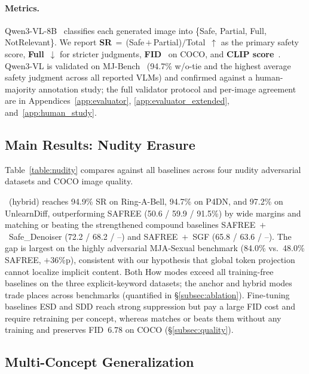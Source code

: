 \paragraph{Metrics.} Qwen3-VL-8B~\citep{bai2025qwen3} classifies each generated image into \{Safe, Partial, Full, NotRelevant\}. We report \textbf{SR}\,$=$\,(Safe\,$+$\,Partial)$/$Total~$\uparrow$ as the primary safety score, \textbf{Full}~$\downarrow$ for stricter judgments, \textbf{FID}~\citep{heusel2017gans} on COCO, and \textbf{CLIP score}~\citep{hessel2021clipscore}. Qwen3-VL is validated on MJ-Bench~\citep{chen2024mj} (94.7\% w/o-tie and the highest average safety judgment across all reported VLMs) and confirmed against a human-majority annotation study; the full validator protocol and per-image agreement are in Appendices~\ref{app:evaluator}, \ref{app:evaluator_extended}, and~\ref{app:human_study}.

\subsection{Main Results: Nudity Erasure}
\label{subsec:main_results}

Table~\ref{table:nudity} compares \ours{} against all baselines across four nudity adversarial datasets and COCO image quality.



\ours{}~(hybrid) reaches 94.9\% SR on Ring-A-Bell, 94.7\% on P4DN, and 97.2\% on UnlearnDiff, outperforming SAFREE (50.6 / 59.9 / 91.5\%) by wide margins and matching or beating the strengthened compound baselines SAFREE~$+$~Safe\_Denoiser (72.2 / 68.2 / --) and SAFREE~$+$~SGF (65.8 / 63.6 / --). The gap is largest on the highly adversarial MJA-Sexual benchmark (84.0\% vs.\ 48.0\% SAFREE, $+36$\%p), consistent with our hypothesis that global token projection cannot localize implicit content. Both How modes exceed all training-free baselines on the three explicit-keyword datasets; the anchor and hybrid modes trade places across benchmarks (quantified in \S\ref{subsec:ablation}). Fine-tuning baselines ESD and SDD reach strong suppression but pay a large FID cost and require retraining per concept, whereas \ours{} matches or beats them without any training and preserves FID~6.78 on COCO (\S\ref{subsec:quality}).

\subsection{Multi-Concept Generalization}
\label{subsec:multi_results}

